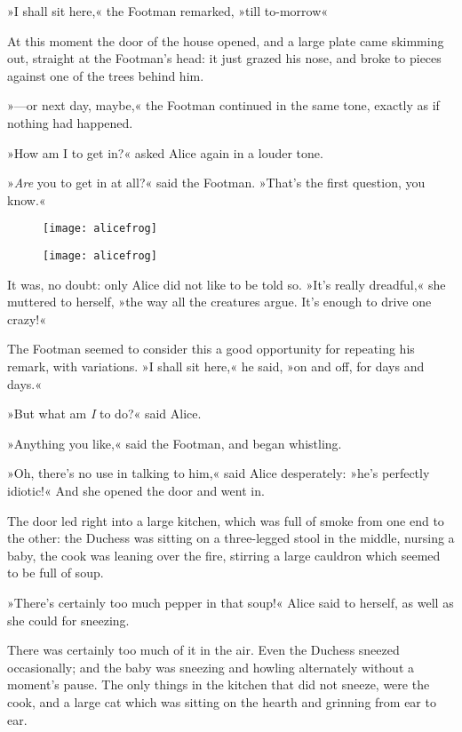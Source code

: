 »I shall sit here,« the Footman remarked, »till to-morrow\longdash«

At this moment the door of the house opened, and a large plate came skimming out, straight at the Footman's head: it just grazed his nose, and broke to pieces against one of the trees behind him.

»—or next day, maybe,« the Footman continued in the same tone, exactly as if nothing had happened.

»How am I to get in?« asked Alice again in a louder tone.

»\textit{Are} you to get in at all?« said the Footman. »That's the first question, you know.«

\begin{letter}
	\begin{figure}[tbh]
		\centering
		\texttt{[image: alicefrog]}
	\end{figure}
\end{letter}

\begin{a4}
	\begin{figure}[tbh]
		\centering
		\texttt{[image: alicefrog]}
	\end{figure}
\end{a4}


It was, no doubt: only Alice did not like to be told so. »It's really dreadful,« she muttered to herself, »the way all the creatures argue. It's enough to drive one crazy!«

The Footman seemed to consider this a good opportunity for repeating his remark, with variations. »I shall sit here,« he said, »on and off, for days and days.«

»But what am \textit{I} to do?« said Alice.

»Anything you like,« said the Footman, and began whistling.

»Oh, there's no use in talking to him,« said Alice desperately: »he's perfectly idiotic!« And she opened the door and went in.

The door led right into a large kitchen, which was full of smoke from one end to the other: the Duchess was sitting on a three-legged stool in the middle, nursing a baby, the cook was leaning over the fire, stirring a large cauldron which seemed to be full of soup.

»There's certainly too much pepper in that soup!« Alice said to herself, as well as she could for sneezing.

There was certainly too much of it in the air. Even the Duchess sneezed occasionally; and the baby was sneezing and howling alternately without a moment's pause. The only things in the kitchen that did not sneeze, were the cook, and a large cat which was sitting on the hearth and grinning from ear to ear.


